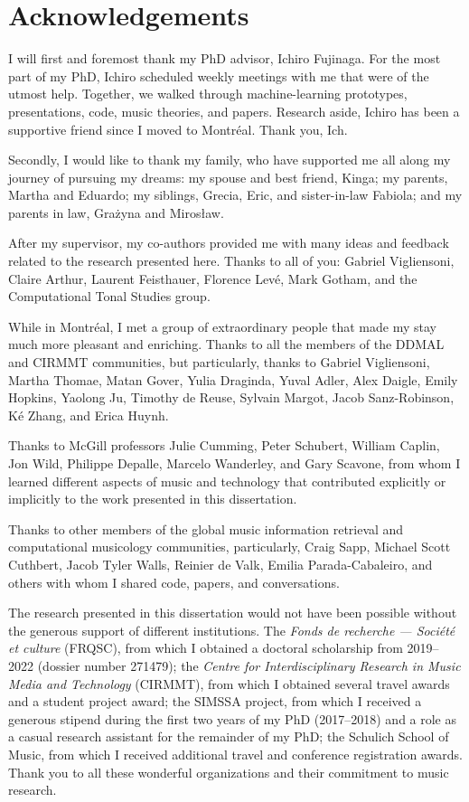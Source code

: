 \chapter*{Acknowledgements}
\label{chap:chap0-ack}

I will first and foremost thank my PhD advisor, Ichiro Fujinaga.
For the most part of my PhD, Ichiro scheduled weekly meetings with me that were of the utmost help. 
Together, we walked through machine-learning prototypes, presentations, code, music theories, and papers. 
Research aside, Ichiro has been a supportive friend since I moved to Montr\'eal. 
Thank you, Ich.

Secondly, I would like to thank my family, who have supported me all along my journey of pursuing my dreams: my spouse and best friend, Kinga; my parents, Martha and Eduardo; my siblings, Grecia, Eric, and sister-in-law Fabiola; and my parents in law, Gra\.zyna and Miros\l{}aw.

After my supervisor, my co-authors provided me with many ideas and feedback related to the research presented here. 
Thanks to all of you: Gabriel Vigliensoni, Claire Arthur, Laurent Feisthauer, Florence Lev\'e, Mark Gotham, and the Computational Tonal Studies group.

While in Montr\'eal, I met a group of extraordinary people that made my stay much more pleasant and enriching.
Thanks to all the members of the DDMAL and CIRMMT communities, but particularly, thanks to Gabriel Vigliensoni, Martha Thomae, Matan Gover, Yulia Draginda, Yuval Adler, Alex Daigle, Emily Hopkins, Yaolong Ju, Timothy de Reuse, Sylvain Margot, Jacob Sanz-Robinson, K\'e Zhang, and Erica Huynh.

Thanks to McGill professors Julie Cumming, Peter Schubert, William Caplin, Jon Wild, Philippe Depalle, Marcelo Wanderley, and Gary Scavone, from whom I learned different aspects of music and technology that contributed explicitly or implicitly to the work presented in this dissertation.

Thanks to other members of the global music information retrieval and computational musicology communities, particularly, Craig Sapp, Michael Scott Cuthbert, Jacob Tyler Walls, Reinier de Valk, Emilia Parada-Cabaleiro, and others with whom I shared code, papers, and conversations.

The research presented in this dissertation would not have been possible without the generous support of different institutions. The \emph{Fonds de recherche --- Soci\'et\'e et culture} (FRQSC), from which I obtained a doctoral scholarship from 2019--2022 (dossier number 271479); the \emph{Centre for Interdisciplinary Research in Music Media and Technology} (CIRMMT), from which I obtained several travel awards and a student project award; the SIMSSA project, from which I received a generous stipend during the first two years of my PhD (2017--2018) and a role as a casual research assistant for the remainder of my PhD; the Schulich School of Music, from which I received additional travel and conference registration awards. 
Thank you to all these wonderful organizations and their commitment to music research.

